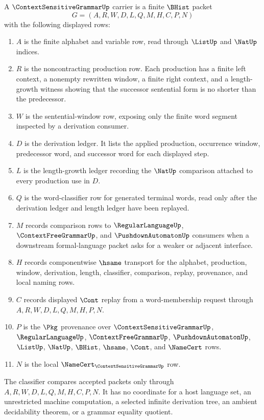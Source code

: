 \begin{definition}
\label{def:context-sensitive-grammar-carrier}
A $\ContextSensitiveGrammarUp$ carrier is a finite $\BHist$ packet
$$
G=(A,R,W,D,L,Q,M,H,C,P,N)
$$
with the following displayed rows:
\begin{enumerate}
\item $A$ is the finite alphabet and variable row, read through $\ListUp$ and $\NatUp$ indices.
\item $R$ is the noncontracting production row. Each production has a finite left context, a nonempty rewritten window, a finite right context, and a length-growth witness showing that the successor sentential form is no shorter than the predecessor.
\item $W$ is the sentential-window row, exposing only the finite word segment inspected by a derivation consumer.
\item $D$ is the derivation ledger. It lists the applied production, occurrence window, predecessor word, and successor word for each displayed step.
\item $L$ is the length-growth ledger recording the $\NatUp$ comparison attached to every production use in $D$.
\item $Q$ is the word-classifier row for generated terminal words, read only after the derivation ledger and length ledger have been replayed.
\item $M$ records comparison rows to $\RegularLanguageUp$, $\ContextFreeGrammarUp$, and $\PushdownAutomatonUp$ consumers when a downstream formal-language packet asks for a weaker or adjacent interface.
\item $H$ records componentwise $\hsame$ transport for the alphabet, production, window, derivation, length, classifier, comparison, replay, provenance, and local naming rows.
\item $C$ records displayed $\Cont$ replay from a word-membership request through $A,R,W,D,L,Q,M,H,P,N$.
\item $P$ is the $\Pkg$ provenance over $\ContextSensitiveGrammarUp$, $\RegularLanguageUp$, $\ContextFreeGrammarUp$, $\PushdownAutomatonUp$, $\ListUp$, $\NatUp$, $\BHist$, $\hsame$, $\Cont$, and $\NameCert$ rows.
\item $N$ is the local $\NameCert_{\ContextSensitiveGrammarUp}$ row.
\end{enumerate}
The classifier compares accepted packets only through $A,R,W,D,L,Q,M,H,C,P,N$. It has no coordinate for a host language set, an unrestricted machine computation, a selected infinite derivation tree, an ambient decidability theorem, or a grammar equality quotient.
\end{definition}

